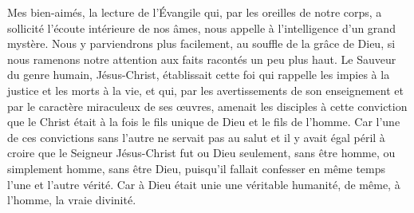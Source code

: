 Mes bien-aimés, la lecture de l’Évangile
	qui, par les oreilles de notre corps,
		a sollicité l’écoute intérieure de nos âmes,
	nous appelle à l’intelligence d’un grand mystère.
Nous y parviendrons plus facilement, au souffle de la grâce de Dieu,
	si nous ramenons notre attention aux faits racontés un peu plus haut.
Le Sauveur du genre humain, Jésus-Christ, établissait cette foi
	qui rappelle les impies à la justice et les morts à la vie,
	et qui, par les avertissements de son enseignement
		et par le caractère miraculeux de ses œuvres,
	amenait les disciples à cette conviction
	que le Christ était à la fois le fils unique de Dieu et le fils de l’homme.
Car l’une de ces convictions sans l’autre ne servait pas au salut
	et il y avait égal péril à croire
	que le Seigneur Jésus-Christ fut ou Dieu seulement, sans être homme,
	ou simplement homme, sans être Dieu,
	puisqu’il fallait confesser en même temps l’une et l’autre vérité.
Car à Dieu était unie une véritable humanité,
	de même, à l’homme, la vraie divinité.
